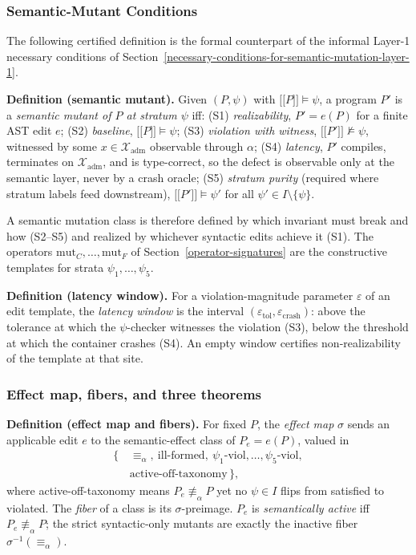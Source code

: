 \documentclass[12pt]{article}
\providecommand{\llbracket}{\mathopen{\lbrack\!\lbrack}}
\providecommand{\rrbracket}{\mathclose{\rbrack\!\rbrack}}
\begin{document}
\subsubsection{Semantic-Mutant Conditions}\label{theory-s1s5}

The following certified definition is the formal counterpart of the
informal Layer-1 necessary conditions of Section~\ref{necessary-conditions-for-semantic-mutation-layer-1}.

\textbf{Definition (semantic mutant).} Given $(P, \psi)$ with
$\llbracket P \rrbracket \models \psi$, a program $P'$ is a
\emph{semantic mutant of $P$ at stratum $\psi$} iff: (S1)
\emph{realizability}, $P' = e(P)$ for a finite AST edit $e$; (S2)
\emph{baseline}, $\llbracket P \rrbracket \models \psi$; (S3)
\emph{violation with witness},
$\llbracket P' \rrbracket \not\models \psi$, witnessed by some
$x \in \mathcal{X}_{\mathrm{adm}}$ observable through $\alpha$; (S4)
\emph{latency}, $P'$ compiles, terminates on $\mathcal{X}_{\mathrm{adm}}$,
and is type-correct, so the defect is observable only at the semantic
layer, never by a crash oracle; (S5) \emph{stratum purity} (required
where stratum labels feed downstream),
$\llbracket P' \rrbracket \models \psi'$ for all
$\psi' \in I \setminus \{\psi\}$.

A semantic mutation class is therefore defined by which invariant must
break and how (S2--S5) and realized by whichever syntactic edits achieve
it (S1). The operators $\mathrm{mut}_C, \dots, \mathrm{mut}_F$ of Section~\ref{operator-signatures}
are the constructive templates for strata $\psi_1, \dots, \psi_5$.

\textbf{Definition (latency window).} For a violation-magnitude
parameter $\varepsilon$ of an edit template, the \emph{latency window}
is the interval $(\varepsilon_{\mathrm{tol}}, \varepsilon_{\mathrm{crash}})$:
above the tolerance at which the $\psi$-checker witnesses the violation
(S3), below the threshold at which the container crashes (S4). An empty
window certifies non-realizability of the template at that site.

\subsubsection{Effect map, fibers, and three theorems}\label{theory-fibers}

\textbf{Definition (effect map and fibers).} For fixed $P$, the
\emph{effect map} $\sigma$ sends an applicable edit $e$ to the
semantic-effect class of $P_e = e(P)$, valued in
\[
\begin{aligned}
\{\,&\equiv_\alpha,\ \text{ill-formed},\
      \psi_1\text{-viol}, \dots, \psi_5\text{-viol},\\
   &\text{active-off-taxonomy}\,\},
\end{aligned}
\]
where active-off-taxonomy means $P_e \not\equiv_\alpha P$ yet no
$\psi \in I$ flips from satisfied to violated. The \emph{fiber} of a
class is its $\sigma$-preimage. $P_e$ is \emph{semantically active} iff
$P_e \not\equiv_\alpha P$; the strict syntactic-only mutants are exactly
the inactive fiber $\sigma^{-1}(\equiv_\alpha)$.
\end{document}
